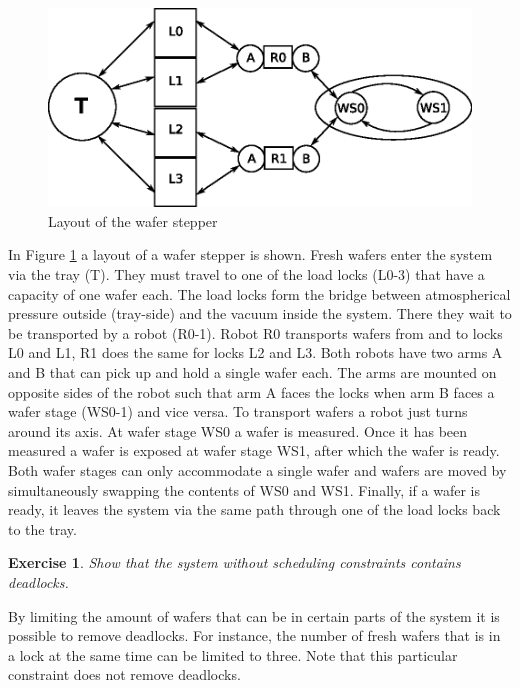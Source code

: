 \documentclass[a4paper,fleqn]{article}
\newtheorem{thexercise}[thdefinition]{Exercise}
\newenvironment{exercise}
  {\begin{thexercise}\em}
  {\end{thexercise}}
\begin{document}
\begin{figure}[htbp]
 \begin{center}
  \includegraphics[scale=1.0]{ASML}
 \end{center}
 \caption{Layout of the wafer stepper}
 \label{fig:wafers}
\end{figure}

In Figure \ref{fig:wafers} a layout of a wafer stepper is shown. Fresh wafers
enter the system via the  tray (T). They must travel to one of the load locks
(L0-3) that have a capacity of one wafer each. The load locks form the bridge
between atmospherical pressure outside (tray-side) and the vacuum inside the
system.  There they wait to be transported by a robot (R0-1). Robot R0
transports wafers from and to locks L0 and L1, R1 does the same for locks
L2 and L3.  Both robots have two arms A and B that can pick up and hold a
single wafer each. The arms are mounted on opposite sides of the robot such that arm
A faces the locks when arm B faces a wafer stage (WS0-1) and vice versa.  To transport wafers
a robot just turns around its axis.  At wafer stage WS0 a wafer is 
measured. Once it has been measured a wafer is exposed at wafer stage WS1,
after which the wafer is ready. Both wafer stages can only accommodate a single
wafer and wafers are moved by simultaneously swapping the contents of WS0 and
WS1.  Finally, if a wafer is ready, it leaves the system via the same path
through one of the load locks back to the tray.

\begin{exercise}
Show that the system without scheduling constraints contains deadlocks.
\end{exercise}

By limiting the amount of wafers that can be in certain parts of the system it
is possible to remove deadlocks.  For instance, the number of fresh wafers that
is in a lock at the same time can be limited to three. Note that this particular
constraint does not remove deadlocks.
\end{document}
